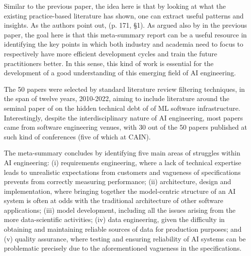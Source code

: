 Similar to the previous paper, the idea here is that by looking at what the existing practice-based literature has shown, one can extract useful patterns and insights. As the authors point out,  (p. 171, \S 1). As argued also by \citeauthor{meesters2022ai} in the previous paper, the goal here is that this meta-summary report can be a useful resource in identifying the key points in which both industry and academia need to focus to respectively have more efficient development cycles and train the future practitioners better. In this sense, this kind of work is essential for the development of a good understanding of this emerging field of AI engineering.

The 50 papers were selected by standard literature review filtering techniques, in the span of twelve years, 2010-2022, aiming to include literature around the seminal paper of \citeauthor{sculley2015hidden} \autocite{sculley2015hidden} on the hidden technical debt of of ML software infrastructure. Interestingly, despite the interdisciplinary nature of AI engineering, most papers came from software engineering venues, with 30 out of the 50 papers published at such kind of conferences (five of which at CAIN). 

The meta-summary concludes by identifying five main areas of struggles within AI engineering: (i) requirements engineering, where a lack of technical expertise leads to unrealistic expectations from customers and vagueness of specifications prevents from correctly measuring performance; (ii) architecture, design and implementation, where bringing together the model-centric structure of an AI system is often at odds with the traditional architecture of other software applications; (iii) model development, including all the issues arising from the more data-scientific activities; (iv) data engineering, given the difficulty in obtaining and maintaining reliable sources of data for production purposes; and (v) quality assurance, where testing and ensuring reliability of AI systems can be problematic precisely due to the aforementioned vagueness in the specifications.

\printbibliography




